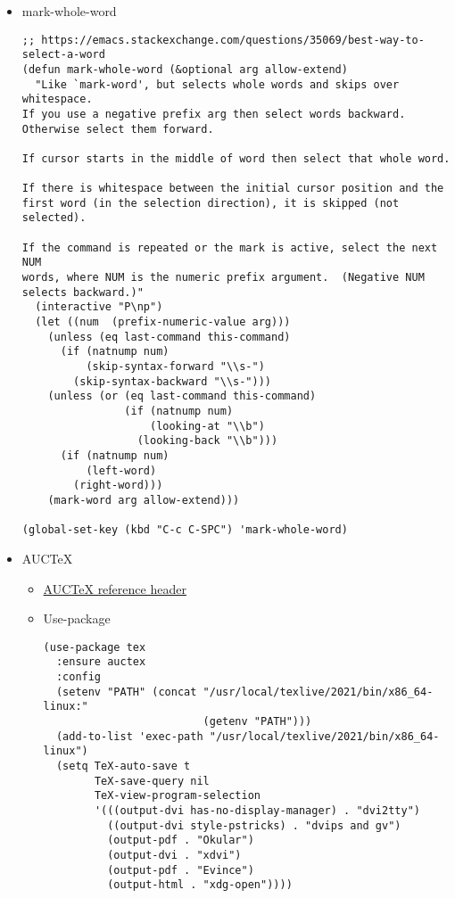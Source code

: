 \documentclass{article}
\begin{document}
\begin{itemize}
\begin{itemize}
\begin{itemize}
\begin{verbatim}
(provide 'ol-plain)

(with-eval-after-load 'org
  (require 'ol-plain))
\end{verbatim}
\end{itemize}
\end{itemize}

\item mark-whole-word
\label{sec:orgf062f2c}
\begin{verbatim}
;; https://emacs.stackexchange.com/questions/35069/best-way-to-select-a-word
(defun mark-whole-word (&optional arg allow-extend)
  "Like `mark-word', but selects whole words and skips over whitespace.
If you use a negative prefix arg then select words backward.
Otherwise select them forward.

If cursor starts in the middle of word then select that whole word.

If there is whitespace between the initial cursor position and the
first word (in the selection direction), it is skipped (not selected).

If the command is repeated or the mark is active, select the next NUM
words, where NUM is the numeric prefix argument.  (Negative NUM
selects backward.)"
  (interactive "P\np")
  (let ((num  (prefix-numeric-value arg)))
    (unless (eq last-command this-command)
      (if (natnump num)
          (skip-syntax-forward "\\s-")
        (skip-syntax-backward "\\s-")))
    (unless (or (eq last-command this-command)
                (if (natnump num)
                    (looking-at "\\b")
                  (looking-back "\\b")))
      (if (natnump num)
          (left-word)
        (right-word)))
    (mark-word arg allow-extend)))

(global-set-key (kbd "C-c C-SPC") 'mark-whole-word)
\end{verbatim}
\item AUCTeX
\label{sec:org8b194d5}
\begin{itemize}
\item \href{basecamp.org}{AUCTeX reference header}
\label{sec:org4a61284}
\item Use-package
\label{sec:org39fb16a}
\begin{verbatim}
(use-package tex
  :ensure auctex
  :config
  (setenv "PATH" (concat "/usr/local/texlive/2021/bin/x86_64-linux:"
                         (getenv "PATH")))
  (add-to-list 'exec-path "/usr/local/texlive/2021/bin/x86_64-linux")
  (setq TeX-auto-save t
        TeX-save-query nil
        TeX-view-program-selection
        '(((output-dvi has-no-display-manager) . "dvi2tty")
          ((output-dvi style-pstricks) . "dvips and gv")
          (output-pdf . "Okular")
          (output-dvi . "xdvi")
          (output-pdf . "Evince")
          (output-html . "xdg-open"))))


\end{verbatim}
\end{itemize}
\end{itemize}
\end{document}
